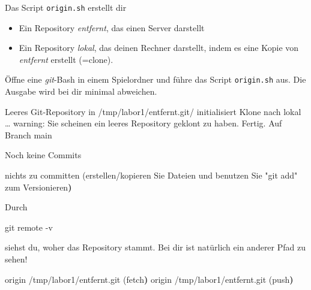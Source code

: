 \documentclass[
  letterpaper,
  DIV=11]{scrreprt}
\newenvironment{Shaded}{\begin{snugshade}}{\end{snugshade}}
\newcommand{\AttributeTok}[1]{\textcolor[rgb]{0.40,0.45,0.13}{#1}}
\newcommand{\ErrorTok}[1]{\textcolor[rgb]{0.68,0.00,0.00}{#1}}
\newcommand{\ExtensionTok}[1]{\textcolor[rgb]{0.00,0.23,0.31}{#1}}
\newcommand{\FunctionTok}[1]{\textcolor[rgb]{0.28,0.35,0.67}{#1}}
\newcommand{\KeywordTok}[1]{\textcolor[rgb]{0.00,0.23,0.31}{\textbf{#1}}}
\newcommand{\NormalTok}[1]{\textcolor[rgb]{0.00,0.23,0.31}{#1}}
\newcommand{\StringTok}[1]{\textcolor[rgb]{0.13,0.47,0.30}{#1}}
\providecommand{\tightlist}{%
  \setlength{\itemsep}{0pt}\setlength{\parskip}{0pt}}\usepackage{longtable,booktabs,array}
\newcommand{\script}[1]{\texttt{#1}\xspace}
\newcommand{\git}{\textit{git}\xspace}
\begin{document}
Das Script \script{origin.sh} erstellt dir

\begin{itemize}
\tightlist
\item
  Ein Repository \emph{entfernt}, das einen Server darstellt
\item
  Ein Repository \emph{lokal}, das deinen Rechner darstellt, indem es
  eine Kopie von \emph{entfernt} erstellt (=clone).
\end{itemize}

Öffne eine \git-Bash in einem Spielordner und führe das Script
\script{origin.sh} aus. Die Ausgabe wird bei dir minimal abweichen.

\begin{Shaded}
\begin{Highlighting}[]
\ExtensionTok{Leeres}\NormalTok{ Git{-}Repository in /tmp/labor1/entfernt.git/ initialisiert}
\ExtensionTok{Klone}\NormalTok{ nach }\StringTok{\textquotesingle{}lokal\textquotesingle{}}\NormalTok{ …}
\ExtensionTok{warning:}\NormalTok{ Sie scheinen ein leeres Repository geklont zu haben.}
\ExtensionTok{Fertig.}
\ExtensionTok{Auf}\NormalTok{ Branch main}

\ExtensionTok{Noch}\NormalTok{ keine Commits}

\ExtensionTok{nichts}\NormalTok{ zu committen }\ErrorTok{(}\ExtensionTok{erstellen/kopieren}\NormalTok{ Sie Dateien und benutzen}
\ExtensionTok{Sie} \StringTok{"git add"}\NormalTok{ zum Versionieren}\KeywordTok{)}
\end{Highlighting}
\end{Shaded}

Durch

\begin{Shaded}
\begin{Highlighting}[]
\FunctionTok{git}\NormalTok{ remote }\AttributeTok{{-}v} 
\end{Highlighting}
\end{Shaded}

siehst du, woher das Repository stammt. Bei dir ist natürlich ein
anderer Pfad zu sehen!

\begin{Shaded}
\begin{Highlighting}[]
\ExtensionTok{origin}\NormalTok{  /tmp/labor1/entfernt.git }\ErrorTok{(}\ExtensionTok{fetch}\KeywordTok{)}
\ExtensionTok{origin}\NormalTok{  /tmp/labor1/entfernt.git }\ErrorTok{(}\ExtensionTok{push}\KeywordTok{)}
\end{Highlighting}
\end{Shaded}
\end{document}
